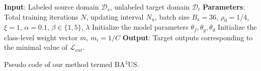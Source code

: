 \documentclass[runningheads]{llncs}
\begin{document}
\begin{algorithm}
	\footnotesize
	\renewcommand\baselinestretch{0.4}\selectfont
	\SetAlgoLined
	\textbf{Input}: Labeled source domain $\mathcal{D}_s$, unlabeled target domain $\mathcal{D}_t$\;
	\textbf{Parameters}: Total training iterations $N$, updating interval $N_u$, batch size $B_s=36$, $\rho_0=1/4$, $\xi=1$, $\alpha=0.1$, $\beta \in \{1,5\}$, $\lambda$\; 
	Initialize the model parameters $\theta_f, \theta_g, \theta_d$\;
	Initialize the class-level weight vector $m$, $m_i=1/C$\;
	\textbf{Output}: Target outputs corresponding to the minimal value of $\mathcal{L}_{ent}$.
	\caption{Pseudo code of our method termed BA$^3$US.}
	\label{alg}
\end{algorithm}





	
\end{document}
